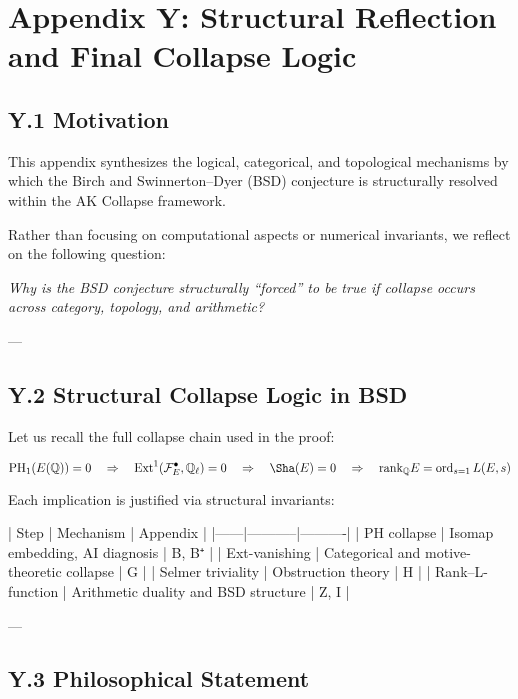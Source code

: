 \section*{Appendix Y: Structural Reflection and Final Collapse Logic}

\subsection*{Y.1 Motivation}

This appendix synthesizes the logical, categorical, and topological mechanisms  
by which the Birch and Swinnerton–Dyer (BSD) conjecture is structurally resolved  
within the AK Collapse framework.

Rather than focusing on computational aspects or numerical invariants,  
we reflect on the following question:

\begin{center}
\textit{Why is the BSD conjecture structurally “forced” to be true  
if collapse occurs across category, topology, and arithmetic?}
\end{center}

---

\subsection*{Y.2 Structural Collapse Logic in BSD}

Let us recall the full collapse chain used in the proof:

\[
\mathrm{PH}_1(E(\mathbb{Q})) = 0
\quad \Rightarrow \quad
\mathrm{Ext}^1(\mathcal{F}_E^\bullet, \mathbb{Q}_\ell) = 0
\quad \Rightarrow \quad
\Sha(E) = 0
\quad \Rightarrow \quad
\mathrm{rank}_{\mathbb{Q}} E = \operatorname{ord}_{s=1} L(E, s)
\]

Each implication is justified via structural invariants:

| Step | Mechanism | Appendix |
|------|-----------|----------|
| PH collapse | Isomap embedding, AI diagnosis | B, B⁺ |
| Ext-vanishing | Categorical and motive-theoretic collapse | G |
| Selmer triviality | Obstruction theory | H |
| Rank–L-function | Arithmetic duality and BSD structure | Z, I |

---

\subsection*{Y.3 Philosophical Statement}

